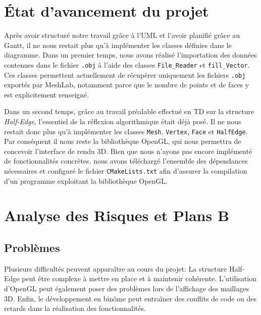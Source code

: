 \section{État d'avancement du projet}
Après avoir structuré notre travail grâce à l'UML et l'avoir planifié grâce au Gantt, il ne nous restait plus qu'à implémenter les classes définies dans le diagramme.
\newline
\newline
Dans un premier temps, nous avons réalisé l'importation des données contenues dans le fichier \texttt{.obj} à l'aide des classes \texttt{File\_Reader} et \texttt{fill\_Vector}. Ces classes permettent actuellement de récupérer uniquement les fichiers \texttt{.obj} exportés par MeshLab, notamment parce que le nombre de points et de faces y est explicitement renseigné.

Dans un second temps, grâce au travail préalable effectué en TD sur la structure \textit{Half-Edge}, l'essentiel de la réflexion algorithmique était déjà posé. Il ne nous restait donc plus qu'à implémenter les classes \texttt{Mesh}, \texttt{Vertex}, \texttt{Face} et \texttt{HalfEdge}.
\newline
\newline
Par conséquent il nous reste la bibliothèque OpenGL, qui nous permettra de concevoir l'interface de rendu 3D. Bien que nous n'ayons pas encore implémenté de fonctionnalités concrètes, nous avons téléchargé l'ensemble des dépendances nécessaires et configuré le fichier \texttt{CMakeLists.txt} afin d'assurer la compilation d'un programme exploitant la bibliothèque OpenGL.
\section{Analyse des Risques et Plans B}
\subsection{Problèmes}
Plusieurs difficultés peuvent apparaître au cours du projet:
\newline
La structure Half-Edge peut être complexe à mettre en place et à maintenir cohérente.
\newline
L'utilisation d'OpenGL peut également poser des problèmes lors de l'affichage des maillages 3D.
\newline
Enfin, le développement en binôme peut entraîner des conflits de code ou des retards dans la réalisation des fonctionnalités.

